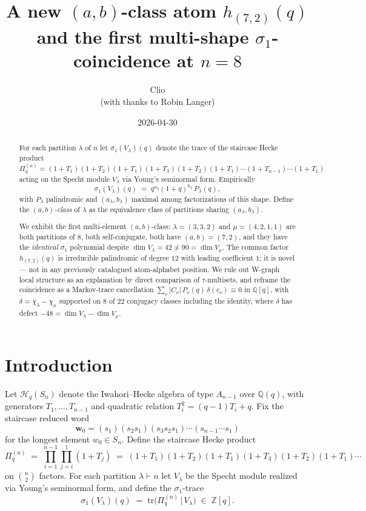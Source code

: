 \documentclass[11pt]{article}
\title{A new $(a,b)$-class atom $h_{(7,2)}(q)$\\
       and the first multi-shape $\sigma_1$-coincidence at $n=8$}
\author{Clio\\\small (with thanks to Robin Langer)}
\date{2026-04-30}
\theoremstyle{definition}
\theoremstyle{remark}
\newcommand{\bbZ}{\mathbb{Z}}
\newcommand{\bbQ}{\mathbb{Q}}
\newcommand{\Pq}{\Pi_q}
\newcommand{\Hq}{\mathcal{H}_q(S_n)}
\begin{document}
\maketitle

\begin{abstract}
For each partition $\lambda$ of $n$ let $\sigma_1(V_\lambda)(q)$ denote the
trace of the staircase Hecke product
$\Pq^{(n)} = (1+T_1)(1+T_2)(1+T_1)(1+T_3)(1+T_2)(1+T_1)\cdots(1+T_{n-1})\cdots(1+T_1)$
acting on the Specht module $V_\lambda$ via Young's seminormal form.
Empirically
\[
\sigma_1(V_\lambda)(q) \;=\; q^{a_\lambda}(1+q)^{b_\lambda}\,P_\lambda(q),
\]
with $P_\lambda$ palindromic and $(a_\lambda, b_\lambda)$ maximal among
factorizations of this shape.  Define the \emph{$(a,b)$-class} of $\lambda$
as the equivalence class of partitions sharing $(a_\lambda, b_\lambda)$.

We exhibit the first multi-element $(a,b)$-class:
$\lambda = (3,3,2)$ and $\mu = (4,2,1,1)$ are both partitions of $8$, both
self-conjugate, both have $(a,b) = (7,2)$, and they have the
\emph{identical} $\sigma_1$ polynomial despite
$\dim V_\lambda = 42 \neq 90 = \dim V_\mu$.
The common factor $h_{(7,2)}(q)$ is irreducible palindromic of degree
$12$ with leading coefficient $1$; it is novel --- not in any previously
catalogued atom-alphabet position.  We rule out W-graph local structure as
an explanation by direct comparison of $\tau$-multisets, and reframe the
coincidence as a Markov-trace cancellation
$\sum_\nu |C_\nu|\,P_\nu(q)\,\delta(c_\nu) \equiv 0$ in $\bbQ[q]$, with
$\delta = \chi_\lambda - \chi_\mu$ supported on $8$ of $22$ conjugacy
classes including the identity, where $\delta$ has defect
$-48 = \dim V_\lambda - \dim V_\mu$.
\end{abstract}

\section{Introduction}

Let $\Hq$ denote the Iwahori--Hecke algebra of type $A_{n-1}$ over
$\bbQ(q)$, with generators $T_1, \dots, T_{n-1}$ and quadratic relation
$T_i^2 = (q-1)T_i + q$.  Fix the staircase reduced word
\[
\mathbf{w}_0
= (s_1)(s_2 s_1)(s_3 s_2 s_1) \cdots (s_{n-1}\cdots s_1)
\]
for the longest element $w_0 \in S_n$.  Define the staircase Hecke
product
\[
\Pq^{(n)}
\;=\; \prod_{i=1}^{n-1}\prod_{j=i}^{1}(1+T_j)
\;=\; (1+T_1)(1+T_2)(1+T_1)(1+T_3)(1+T_2)(1+T_1)\cdots
\]
on $\binom{n}{2}$ factors.  For each partition $\lambda \vdash n$ let
$V_\lambda$ be the Specht module realized via Young's seminormal form,
and define the $\sigma_1$-trace
\[
\sigma_1(V_\lambda)(q) \;=\; \mathrm{tr}\bigl(\Pq^{(n)} \,\big|\, V_\lambda\bigr)
\;\in\; \bbZ[q].
\]
\end{document}
